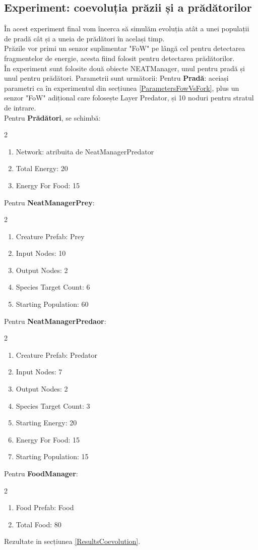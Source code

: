 \subsection{Experiment: coevoluția prăzii și a prădătorilor}\label{ParametersCoevolution}
În acest experiment final vom încerca să simulăm evoluția atât a unei populații de pradă cât și a uneia de prădători în același timp.\\
Prăzile vor primi un senzor suplimentar "FoW" pe lângă cel pentru detectarea fragmentelor de energie, acesta fiind folosit pentru detectarea prădătorilor.\\
În experiment sunt folosite două obiecte NEATManager, unul pentru pradă și unul pentru prădători.
Parametrii sunt următorii:
Pentru \textbf{Pradă}: aceiași parametri ca în experimentul din secțiunea \ref{ParametersFowVsFork}, plus un senzor "FoW" adițional care folosește Layer Predator, și 10 noduri pentru stratul de intrare.\\
Pentru \textbf{Prădători}, se schimbă:
\begin{multicols}{2}
    \begin{enumerate}
        \item Network: atribuita de NeatManagerPredator
        \item Total Energy: 20
        \item Energy For Food: 15
    \end{enumerate}
\end{multicols}
Pentru \textbf{NeatManagerPrey}:
\begin{multicols}{2}
    \begin{enumerate}
        \item Creature Prefab: Prey
        \item Input Nodes: 10
        \item Output Nodes: 2
        \item Species Target Count: 6
        \item Starting Population: 60
    \end{enumerate}
\end{multicols}
Pentru \textbf{NeatManagerPredaor}:
\begin{multicols}{2}
    \begin{enumerate}
        \item Creature Prefab: Predator
        \item Input Nodes: 7
        \item Output Nodes: 2
        \item Species Target Count: 3
        \item Starting Energy: 20
        \item Energy For Food: 15
        \item Starting Population: 15
    \end{enumerate}
\end{multicols}
Pentru \textbf{FoodManager}:
\begin{multicols}{2}
    \begin{enumerate}
        \item Food Prefab: Food
        \item Total Food: 80
    \end{enumerate}
\end{multicols}
Rezultate in secțiunea \ref{ResultsCoevolution}.